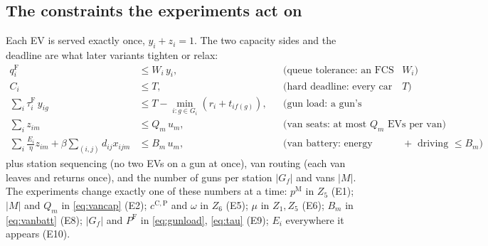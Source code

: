 \subsection{The constraints the experiments act on}
Each EV is served exactly once, $y_i+z_i=1$. The two capacity sides and the deadline are what later variants
tighten or relax:
\begin{align}
q^{\mathrm F}_i &\le W_i\,y_i, & &\text{(queue tolerance: an FCS user waits at most $W_i$)} \label{eq:qtol}\\
C_i &\le T, & &\text{(hard deadline: every car is charged by $T$)} \label{eq:deadline}\\
\textstyle\sum_{i}\tau^{\mathrm F}_i\,y_{ig} &\le T-\min_{i:g\in G_i}(r_i+t_{if(g)}), & &\text{(gun load: a gun's charging fits its window)} \label{eq:gunload}\\
\textstyle\sum_{i} z_{im} &\le Q_m\,u_m, & &\text{(van seats: at most $Q_m$ EVs per van)} \label{eq:vancap}\\
\textstyle\sum_{i}\tfrac{E_i}{\eta}z_{im}+\beta\!\sum_{(i,j)}d_{ij}x_{ijm} &\le B_m\,u_m, & &\text{(van battery: energy served $+$ driving $\le B_m$)} \label{eq:vanbatt}
\end{align}
plus station sequencing (no two EVs on a gun at once), van routing (each van leaves and returns once), and the
number of guns per station $|G_f|$ and vans $|M|$. The experiments change exactly one of these numbers at a time:
$p^{\mathrm M}$ in $Z_5$ (E1); $|M|$ and $Q_m$ in \eqref{eq:vancap} (E2); $c^{\mathrm C,\mathrm P}$ and $\omega$ in
$Z_6$ (E5); $\mu$ in $Z_1,Z_5$ (E6); $B_m$ in \eqref{eq:vanbatt} (E8); $|G_f|$ and $P^{\mathrm F}$ in
\eqref{eq:gunload}, \eqref{eq:tau} (E9); $E_i$ everywhere it appears (E10).

